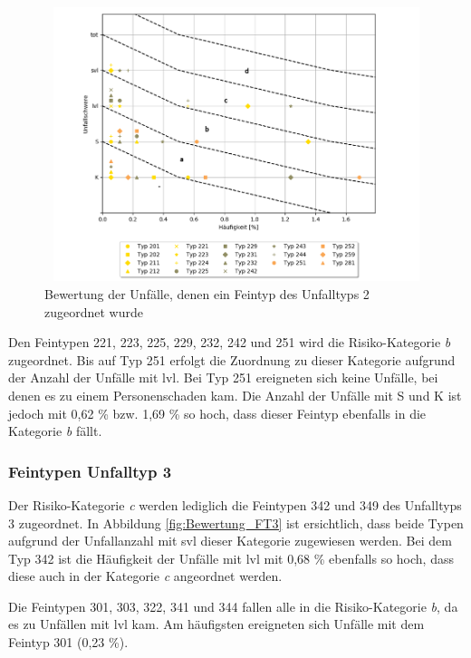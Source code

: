 \begin{savenotes}
	\begin{figure}[H]
		\centering
		\includegraphics[width=12cm,height=8cm]{figures/Bewertung_FT2}
		\caption[Bewertung der Unfälle, denen ein Feintyp des Unfalltyps 2 zugeordnet wurde]{Bewertung der Unfälle, denen ein Feintyp des Unfalltyps 2 zugeordnet wurde}\label{fig:Bewertung_FT2}
	\end{figure}
\end{savenotes}

Den Feintypen 221, 223, 225, 229, 232, 242 und 251 wird die Risiko-Kategorie \textit{b} zugeordnet. Bis auf Typ 251 erfolgt die Zuordnung zu dieser Kategorie aufgrund der Anzahl der Unfälle mit \ac{lvl}. Bei Typ 251 ereigneten sich keine Unfälle, bei denen es zu einem Personenschaden kam. Die Anzahl der Unfälle mit \ac{S} und \ac{K} ist jedoch mit 0,62 \% bzw. 1,69 \% so hoch, dass dieser Feintyp ebenfalls in die Kategorie \textit{b} fällt.

\subsubsection{Feintypen Unfalltyp 3}
Der Risiko-Kategorie \textit{c} werden lediglich die Feintypen 342 und 349 des Unfalltyps 3 zugeordnet. In Abbildung \ref{fig:Bewertung_FT3} ist ersichtlich, dass beide Typen aufgrund der Unfallanzahl mit \ac{svl} dieser Kategorie zugewiesen werden. Bei dem Typ 342 ist die Häufigkeit der Unfälle mit \ac{lvl} mit 0,68 \% ebenfalls so hoch, dass diese auch in der Kategorie \textit{c} angeordnet werden.

Die Feintypen 301, 303, 322, 341 und 344 fallen alle in die Risiko-Kategorie \textit{b}, da es zu Unfällen mit \ac{lvl} kam. Am häufigsten ereigneten sich Unfälle mit dem Feintyp 301 (0,23 \%).

